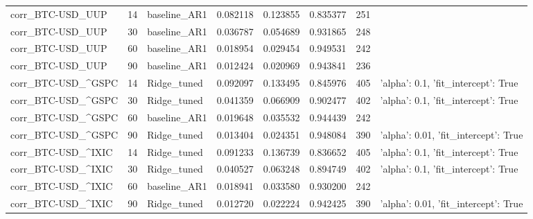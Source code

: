 \begin{longtable}{lrlrrrrl}
corr\_BTC-USD\_UUP & 14 & baseline\_AR1 & 0.082118 & 0.123855 & 0.835377 & 251 &  \\
corr\_BTC-USD\_UUP & 30 & baseline\_AR1 & 0.036787 & 0.054689 & 0.931865 & 248 &  \\
corr\_BTC-USD\_UUP & 60 & baseline\_AR1 & 0.018954 & 0.029454 & 0.949531 & 242 &  \\
corr\_BTC-USD\_UUP & 90 & baseline\_AR1 & 0.012424 & 0.020969 & 0.943841 & 236 &  \\
corr\_BTC-USD\_^GSPC & 14 & Ridge\_tuned & 0.092097 & 0.133495 & 0.845976 & 405 & {'alpha': 0.1, 'fit\_intercept': True} \\
corr\_BTC-USD\_^GSPC & 30 & Ridge\_tuned & 0.041359 & 0.066909 & 0.902477 & 402 & {'alpha': 0.1, 'fit\_intercept': True} \\
corr\_BTC-USD\_^GSPC & 60 & baseline\_AR1 & 0.019648 & 0.035532 & 0.944439 & 242 &  \\
corr\_BTC-USD\_^GSPC & 90 & Ridge\_tuned & 0.013404 & 0.024351 & 0.948084 & 390 & {'alpha': 0.01, 'fit\_intercept': True} \\
corr\_BTC-USD\_^IXIC & 14 & Ridge\_tuned & 0.091233 & 0.136739 & 0.836652 & 405 & {'alpha': 0.1, 'fit\_intercept': True} \\
corr\_BTC-USD\_^IXIC & 30 & Ridge\_tuned & 0.040527 & 0.063248 & 0.894749 & 402 & {'alpha': 0.1, 'fit\_intercept': True} \\
corr\_BTC-USD\_^IXIC & 60 & baseline\_AR1 & 0.018941 & 0.033580 & 0.930200 & 242 &  \\
corr\_BTC-USD\_^IXIC & 90 & Ridge\_tuned & 0.012720 & 0.022224 & 0.942425 & 390 & {'alpha': 0.01, 'fit\_intercept': True} \\
\end{longtable}
